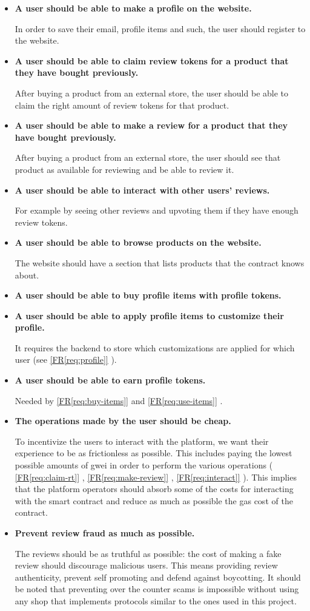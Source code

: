 \documentclass[12pt,a4paper,oneside]{article}
\theoremstyle{definition}
\newcounter{freqcounter}
\newcommand{\req}[1]{%
	\textbf{FR\ref*{#1}}\refstepcounter{freqcounter}\label{#1}%
}
\newcommand{\reqref}[1]{%
	\hyperref[#1]{[FR\ref*{#1}]}%
}
\newcounter{nfreqcounter}
\newcommand{\nreq}[1]{%
	\textbf{NFR\ref*{#1}}\refstepcounter{nfreqcounter}\label{#1}%
}
\newcommand{\ReqItemStyle}[1]{\textbf{#1}}
\newcommand{\ReqItem}[2]{\item[\req{#1}] \ReqItemStyle{#2}}
\newcommand{\NReqItem}[2]{\item[\nreq{#1}] \ReqItemStyle{#2}}
\begin{document}
\begin{itemize}
	\ReqItem{req:profile}{A user should be able to make a profile on the website.}

	In order to save their email, profile items and such, the user should register to the website.

	\ReqItem{req:claim-rt}{A user should be able to claim review tokens for a product that they have bought previously.}

	After buying a product from an external store, the user should be able to claim the right amount of review tokens for that product.

	\ReqItem{req:make-review}{A user should be able to make a review for a product that they have bought previously.}

	After buying a product from an external store, the user should see that product as available for reviewing and be able to review it.

	\ReqItem{req:interact}{A user should be able to interact with other users' reviews.}

	For example by seeing other reviews and upvoting them if they have enough review tokens.

	\ReqItem{req:browse-products}{A user should be able to browse products on the website.}

	The website should have a section that lists products that the contract knows about.

	\ReqItem{req:buy-items}{A user should be able to buy profile items with profile tokens.}

	\ReqItem{req:use-items}{A user should be able to apply profile items to customize their profile.}

	It requires the backend to store which customizations are applied for which user (see \reqref{req:profile}).

	\ReqItem{req:earn-pt}{A user should be able to earn profile tokens.}

	Needed by \reqref{req:buy-items} and \reqref{req:use-items}.

	\NReqItem{nreq:low-cost}{The operations made by the user should be cheap.}

	To incentivize the users to interact with the platform, we want their experience to be as frictionless as possible. This includes paying the lowest possible amounts of gwei in order to perform the various operations (\reqref{req:claim-rt}, \reqref{req:make-review}, \reqref{req:interact}).
	This implies that the platform operators should absorb some of the costs for interacting with the smart contract and reduce as much as possible the gas cost of the contract.

	\NReqItem{nreq:security}{Prevent review fraud as much as possible.}

	The reviews should be as truthful as possible: the cost of making a fake review should discourage malicious users.
	This means providing review authenticity, prevent self promoting and defend against boycotting.
	It should be noted that preventing over the counter scams is impossible without using any shop that implements protocols similar to the ones used in this project.
\end{itemize}
\end{document}
